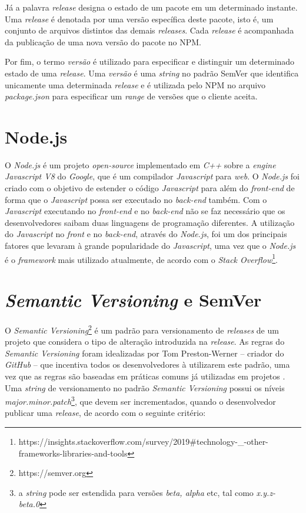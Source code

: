 Já a palavra \textit{release} designa o estado de um pacote em um determinado instante. Uma \textit{release} é denotada por uma versão específica deste pacote, isto é, um conjunto de arquivos distintos das demais \textit{releases}. Cada \textit{release} é acompanhada da publicação de uma nova versão do pacote no \gls{NPM}.

Por fim, o termo \textit{versão} é utilizado para especificar e distinguir um determinado estado de uma \textit{release}. Uma \textit{versão} é uma \textit{string} no padrão \gls{SemVer} que identifica unicamente uma determinada \textit{release} e é utilizada pelo \gls{NPM} no arquivo \textit{package.json} para especificar um \textit{range} de versões que o cliente aceita.

\section{Node.js}
\label{ref-teo:node}
O \textit{Node.js} é um projeto \textit{open-source} implementado em \textit{C++} sobre a \textit{engine Javascript V8} do \textit{Google}, que é um compilador \textit{Javascript} para \textit{web}. O \textit{Node.js} foi criado com o objetivo de estender o código \textit{Javascript} para além do \textit{front-end} de forma que o \textit{Javascript} possa ser executado no \textit{back-end} também. Com o \textit{Javascript} executando no \textit{front-end} e no \textit{back-end} não se faz necessário que os desenvolvedores saibam duas linguagens de programação diferentes. A utilização do \textit{Javascript} no \textit{front} e no \textit{back-end}, através do \textit{Node.js}, foi um dos principais fatores que levaram à grande popularidade do \textit{Javascript}, uma vez que o \textit{Node.js} é o \textit{framework} mais utilizado atualmente, de acordo com o \textit{Stack Overflow}\footnote{https://insights.stackoverflow.com/survey/2019\#technology-\_-other-frameworks-libraries-and-tools}.

\section{\textit{Semantic Versioning} e \gls{SemVer}}
\label{ref-teo:semver}
O \textit{Semantic Versioning}\footnote{https://semver.org} é um padrão para versionamento de \textit{releases} de um projeto que considera o tipo de alteração introduzida na \textit{release}. As regras do \textit{Semantic Versioning} foram idealizadas por Tom Preston-Werner -- criador do \textit{GitHub} -- que incentiva todos os desenvolvedores à utilizarem este padrão, uma vez que as regras são baseadas em práticas comuns já utilizadas em projetos \cite{teorical_reference:semver}. Uma \textit{string} de versionamento no padrão \textit{Semantic Versioning} possui os níveis \textit{major.minor.patch}\footnote{a \textit{string} pode ser estendida para versões \textit{beta, alpha} etc, tal como \textit{x.y.z-beta.0}}, que devem ser incrementados, quando o desenvolvedor publicar uma \textit{release}, de acordo com o seguinte critério:

